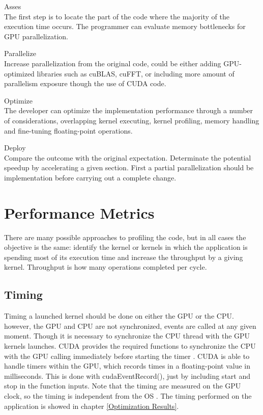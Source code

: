 \begin{description}

 \item{Asses} \hfill \\
 The first step is to locate the part of the code where the majority of the execution time occurs. The programmer can evaluate memory bottlenecks for GPU parallelization.
 \item{Parallelize} \hfill \\
 Increase parallelization from the original code, could be either adding GPU-optimized libraries such as cuBLAS, cuFFT, or including more amount of parallelism exposure though the use of CUDA code.
 \item{Optimize} \hfill \\
The developer can optimize the implementation performance through a number of considerations, overlapping kernel executing, kernel profiling, memory handling and fine-tuning floating-point operations.
 \item{Deploy} \hfill \\
 Compare the outcome with the original expectation. Determinate the potential speedup by accelerating a given section. First a partial parallelization should be implementation before carrying out a complete change.
 \end{description}

\section{Performance Metrics}

There are many possible approaches to profiling the code, but in all cases the objective is the same:  identify the kernel or kernels in which the application is spending most of its execution time and increase the throughput by a giving kernel. Throughput is how many operations completed per cycle.

\subsection{Timing}

Timing a launched kernel should be done on either the GPU or the CPU. however, the GPU and CPU are not synchronized, events are called at any given moment. Though it is necessary to synchronize the CPU thread with the GPU kernels launches. CUDA provides the required  functions to synchronize the CPU with the GPU calling immediately before starting the timer \cite{practices}. CUDA is able to handle timers within the GPU, which records times in a floating-point value in milliseconds. This is done with {\listf cudaEventRecord()}, just by including {\listf start} and {\listf stop } in the function inputs. Note that the timing are measured on the GPU clock, so the timing is independent from the OS \cite{cook}. The timing performed on the application is showed in chapter \ref{Optimization Results}.

